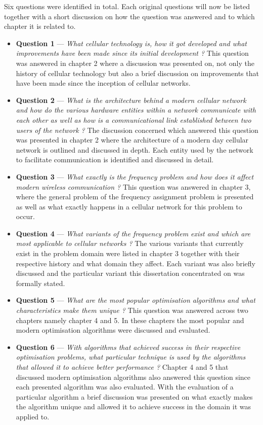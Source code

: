 Six questions were identified in total. Each original questions will now be listed together with a short discussion on how the question was answered and to which chapter it is related to.
\begin{itemize}
\item \textbf{Question 1} --- \emph{What cellular technology is, how it got developed and what improvements have been made since its initial development ?} This question was answered in chapter 2 where a discussion was presented on, not only the history of cellular technology but also a brief discussion on improvements that have been made since the inception of cellular networks.
\item \textbf{Question 2} --- \emph{What is the architecture behind a modern cellular network and how do the various hardware entities within a network communicate with each other as well as how is a communicational link established between two users of the network ?}  The discussion concerned which answered this question was presented in chapter 2 where the architecture of a modern day cellular network is outlined and discussed in depth. Each entity used by the network to facilitate communication is identified and discussed in detail.
\item \textbf{Question 3} --- \emph{What exactly is the frequency problem and how does it affect modern wireless communication ? } This question was answered in chapter 3, where the general problem of the frequency assignment problem is presented as well as what exactly happens in a cellular network for this problem to occur.
\item \textbf{Question 4} --- \emph{What variants of the frequency problem exist and which are most applicable to cellular networks ?} The various variants that currently exist in the problem domain were listed in chapter 3 together with their respective history and what domain they affect. Each variant was also briefly discussed and the particular variant this dissertation concentrated on was formally stated. 
\item \textbf{Question 5} --- \emph{What are the most popular optimisation algorithms and what characteristics make them unique ?} This question was answered across two chapters namely chapter 4 and 5. In these chapters the most popular and modern optimisation algorithms were discussed and evaluated.
\item \textbf{Question 6} --- \emph{With algorithms that achieved success in their respective optimisation problems, what particular technique is used by the algorithms that allowed it to achieve better performance ?} Chapter 4 and 5 that discussed modern optimisation algorithms also answered this question since each presented algorithm was also evaluated. With the evaluation of a particular algorithm a brief discussion was presented on what exactly makes the algorithm unique and allowed it to achieve success in the domain it was applied to.
\end{itemize}

